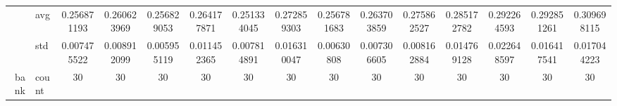 \begin{table}[htbp]
{\begin{tabular}{rlccc|c|c|c|c|c|ccccc}
			                                                                               & avg                & \cellcolor[rgb]{ .651,  .82,  .494}0.256871193                                 & \cellcolor[rgb]{ .827,  .871,  .506}0.260623969                                & \cellcolor[rgb]{ .647,  .82,  .494}0.256829053                                 & \cellcolor[rgb]{ 1,  .922,  .518}0.264177871    & \cellcolor[rgb]{ .388,  .745,  .482}\textcolor[rgb]{ 0,  .38,  0}{0.251334045} & \cellcolor[rgb]{ .996,  .827,  .502}0.272859303 & \cellcolor[rgb]{ .647,  .82,  .494}0.256781683                                 & \cellcolor[rgb]{ .976,  .914,  .514}0.263703859 & \cellcolor[rgb]{ .996,  .792,  .494}0.275862527 & \cellcolor[rgb]{ .988,  .69,  .475}0.285172782  & \cellcolor[rgb]{ .984,  .608,  .459}0.292264593 & \cellcolor[rgb]{ .984,  .604,  .459}0.292851261 & \cellcolor[rgb]{ .973,  .412,  .42}0.309698115  \\
			                                                                               & std                & 0.007475522                                                                    & 0.008912099                                                                    & 0.005955119                                                                    & 0.011452365                                     & 0.007814891                                                                    & 0.016310047                                     & 0.00630808                                                                     & 0.007306605                                     & 0.008162884                                     & 0.014769128                                     & 0.022648597                                     & 0.016417541                                     & 0.017044223                                     \\
			bank                                                                           & count              & 30                                                                             & 30                                                                             & 30                                                                             & 30                                              & 30                                                                             & 30                                              & 30                                                                             & 30                                              & 30                                              & 30                                              & 30                                              & 30                                              & 30                                              \\

\end{tabular}}
\end{table}
